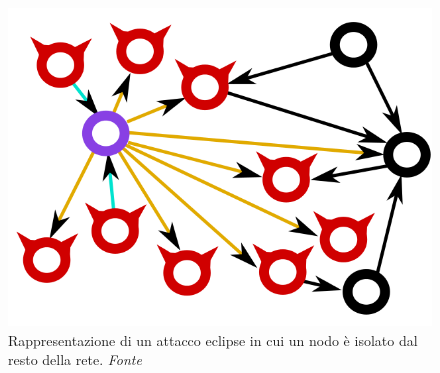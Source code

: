 \begin{figure}
	\centering
	\includegraphics[scale=0.3]{img/capuno/eclipse_attack.png}
	\caption{Rappresentazione di un attacco eclipse in cui un nodo è isolato dal resto della rete. \emph{Fonte~\cite{heilman2015eclipse}}}
	\label{fig:eclipse_attack}
\end{figure}

